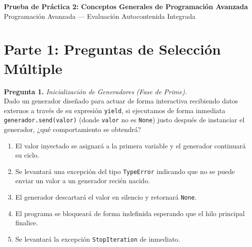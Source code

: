 \documentclass[12pt,letterpaper]{article}
\begin{document}
\begin{center}
  {\large \textbf{Prueba de Práctica 2: Conceptos Generales de Programación Avanzada}} \\
  \medskip
  {Programación Avanzada --- Evaluación Autocontenida Integrada}
\end{center}

\bigskip

\section*{Parte 1: Preguntas de Selección Múltiple}

\textbf{Pregunta 1.} \textit{Inicialización de Generadores (Fase de Prime).} \\
Dado un generador diseñado para actuar de forma interactiva recibiendo datos externos a través de su expresión \texttt{yield}, si ejecutamos de forma inmediata \texttt{generador.send(valor)} (donde \texttt{valor} no es \texttt{None}) justo después de instanciar el generador, ¿qué comportamiento se obtendrá?
\begin{enumerate}[label=\alph*)]
  \item El valor inyectado se asignará a la primera variable y el generador continuará su ciclo.
  \item Se levantará una excepción del tipo \texttt{TypeError} indicando que no se puede enviar un valor a un generador recién nacido.
  \item El generador descartará el valor en silencio y retornará \texttt{None}.
  \item El programa se bloqueará de forma indefinida esperando que el hilo principal finalice.
  \item Se levantará la excepción \texttt{StopIteration} de inmediato.
\end{enumerate}

\bigskip
\end{document}
